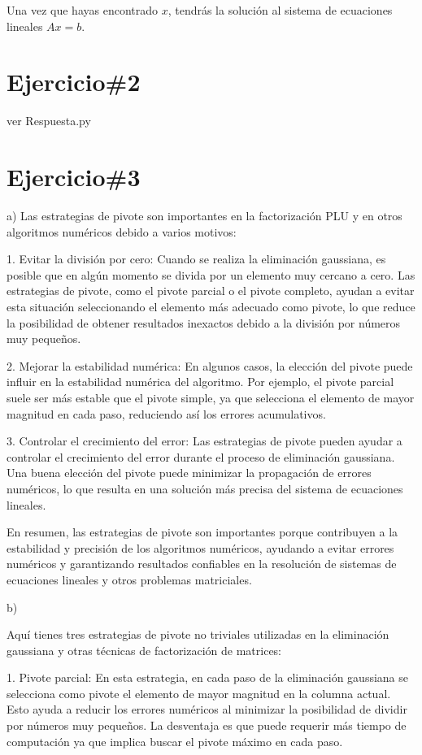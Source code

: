\documentclass[a4paper,12pt]{article}
\begin{document}
Una vez que hayas encontrado \( x \), tendrás la solución al sistema de ecuaciones lineales \( Ax = b \).


\section*{Ejercicio\#2}

ver Respuesta.py

\section*{Ejercicio\#3}

a)
Las estrategias de pivote son importantes en la factorización PLU y en otros algoritmos numéricos debido a varios motivos:

1. Evitar la división por cero: Cuando se realiza la eliminación gaussiana, es posible que en algún momento se divida por un elemento muy cercano a cero. Las estrategias de pivote, como el pivote parcial o el pivote completo, ayudan a evitar esta situación seleccionando el elemento más adecuado como pivote, lo que reduce la posibilidad de obtener resultados inexactos debido a la división por números muy pequeños.

2. Mejorar la estabilidad numérica: En algunos casos, la elección del pivote puede influir en la estabilidad numérica del algoritmo. Por ejemplo, el pivote parcial suele ser más estable que el pivote simple, ya que selecciona el elemento de mayor magnitud en cada paso, reduciendo así los errores acumulativos.

3. Controlar el crecimiento del error: Las estrategias de pivote pueden ayudar a controlar el crecimiento del error durante el proceso de eliminación gaussiana. Una buena elección del pivote puede minimizar la propagación de errores numéricos, lo que resulta en una solución más precisa del sistema de ecuaciones lineales.

En resumen, las estrategias de pivote son importantes porque contribuyen a la estabilidad y precisión de los algoritmos numéricos, ayudando a evitar errores numéricos y garantizando resultados confiables en la resolución de sistemas de ecuaciones lineales y otros problemas matriciales.

b)

Aquí tienes tres estrategias de pivote no triviales utilizadas en la eliminación gaussiana y otras técnicas de factorización de matrices:

1. Pivote parcial: En esta estrategia, en cada paso de la eliminación gaussiana se selecciona como pivote el elemento de mayor magnitud en la columna actual. Esto ayuda a reducir los errores numéricos al minimizar la posibilidad de dividir por números muy pequeños. La desventaja es que puede requerir más tiempo de computación ya que implica buscar el pivote máximo en cada paso.
\end{document}
